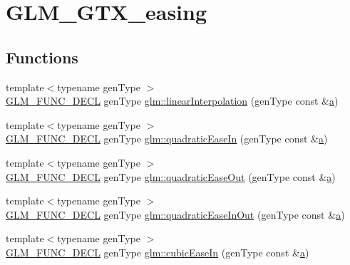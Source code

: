 \hypertarget{group__gtx__easing}{}\section{G\+L\+M\+\_\+\+G\+T\+X\+\_\+easing}
\label{group__gtx__easing}
\subsection*{Functions}
\begin{DoxyCompactItemize}
\item 
{\footnotesize template$<$typename gen\+Type $>$ }\\\mbox{\hyperlink{setup_8hpp_ab2d052de21a70539923e9bcbf6e83a51}{G\+L\+M\+\_\+\+F\+U\+N\+C\+\_\+\+D\+E\+CL}} gen\+Type \mbox{\hyperlink{group__gtx__easing_ga290c3e47cb0a49f2e8abe90b1872b649}{glm\+::linear\+Interpolation}} (gen\+Type const \&\mbox{\hyperlink{_s_d_l__opengl__glext_8h_a3309789fc188587d666cda5ece79cf82}{a}})
\item 
{\footnotesize template$<$typename gen\+Type $>$ }\\\mbox{\hyperlink{setup_8hpp_ab2d052de21a70539923e9bcbf6e83a51}{G\+L\+M\+\_\+\+F\+U\+N\+C\+\_\+\+D\+E\+CL}} gen\+Type \mbox{\hyperlink{group__gtx__easing_gaf42089d35855695132d217cd902304a0}{glm\+::quadratic\+Ease\+In}} (gen\+Type const \&\mbox{\hyperlink{_s_d_l__opengl__glext_8h_a3309789fc188587d666cda5ece79cf82}{a}})
\item 
{\footnotesize template$<$typename gen\+Type $>$ }\\\mbox{\hyperlink{setup_8hpp_ab2d052de21a70539923e9bcbf6e83a51}{G\+L\+M\+\_\+\+F\+U\+N\+C\+\_\+\+D\+E\+CL}} gen\+Type \mbox{\hyperlink{group__gtx__easing_ga283717bc2d937547ad34ec0472234ee3}{glm\+::quadratic\+Ease\+Out}} (gen\+Type const \&\mbox{\hyperlink{_s_d_l__opengl__glext_8h_a3309789fc188587d666cda5ece79cf82}{a}})
\item 
{\footnotesize template$<$typename gen\+Type $>$ }\\\mbox{\hyperlink{setup_8hpp_ab2d052de21a70539923e9bcbf6e83a51}{G\+L\+M\+\_\+\+F\+U\+N\+C\+\_\+\+D\+E\+CL}} gen\+Type \mbox{\hyperlink{group__gtx__easing_ga03e8fc2d7945a4e63ee33b2159c14cea}{glm\+::quadratic\+Ease\+In\+Out}} (gen\+Type const \&\mbox{\hyperlink{_s_d_l__opengl__glext_8h_a3309789fc188587d666cda5ece79cf82}{a}})
\item 
{\footnotesize template$<$typename gen\+Type $>$ }\\\mbox{\hyperlink{setup_8hpp_ab2d052de21a70539923e9bcbf6e83a51}{G\+L\+M\+\_\+\+F\+U\+N\+C\+\_\+\+D\+E\+CL}} gen\+Type \mbox{\hyperlink{group__gtx__easing_gaff52f746102b94864d105563ba8895ae}{glm\+::cubic\+Ease\+In}} (gen\+Type const \&\mbox{\hyperlink{_s_d_l__opengl__glext_8h_a3309789fc188587d666cda5ece79cf82}{a}})

\end{DoxyCompactItemize}

